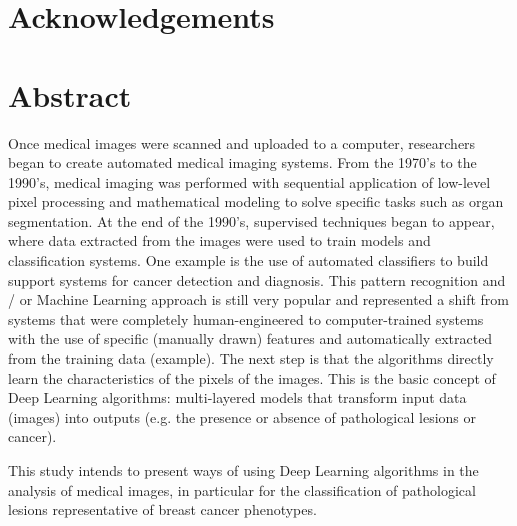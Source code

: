 \documentclass[
  twoside,
  11pt, a4paper,
  footinclude=true,
  headinclude=true,
  cleardoublepage=empty
]{scrbook}
\author{João Pedro Pereira Fontes}
\date{\myear} %
\begin{document}
  \umfrontcover
  \null\newpage
  \umtitlepage

  \begingroup
  \fontsize{12pt}{15pt}\selectfont

  \chapter*{Acknowledgements}






  \null\newpage\null\newpage
  \chapter*{Abstract}
    Once medical images were scanned and uploaded to a computer, researchers began to create automated medical imaging systems. From the 1970's to the 1990's, medical imaging was performed with sequential application of low-level pixel processing and mathematical modeling to solve specific tasks such as organ segmentation. At the end of the 1990's, supervised techniques began to appear, where data extracted from the images were used to train models and classification systems. One example is the use of automated classifiers to build support systems for cancer detection and diagnosis. This pattern recognition and / or Machine Learning approach is still very popular and represented a shift from systems that were completely human-engineered to computer-trained systems with the use of specific (manually drawn) features and automatically extracted from the training data (example). The next step is that the algorithms directly learn the characteristics of the pixels of the images. This is the basic concept of Deep Learning algorithms: multi-layered models that transform input data (images) into outputs (e.g. the presence or absence of pathological lesions or cancer).

    This study intends to present ways of using Deep Learning algorithms in the analysis of medical images, in particular for the classification of pathological lesions representative of breast cancer phenotypes.
\end{document}
